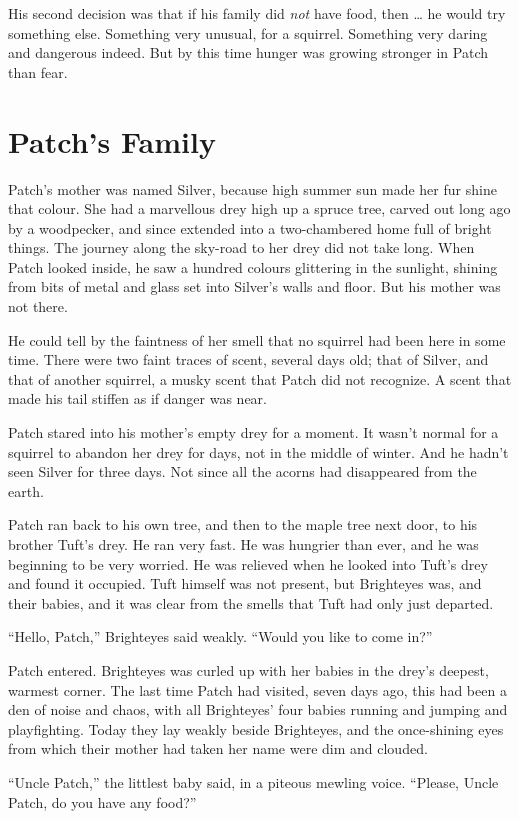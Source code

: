 \documentclass[ebook,oneside,openany,17pt]{memoir}
\renewcommand{\thechapter}{\Roman{chapter}}
\newcounter{sections}
\newcommand{\sections}[1]{%
  \section*{#1}
  \addtocounter{sections}{1}%
  \pdfbookmark[1]{#1}{section.\thechapter.\thesections}}
\begin{document}
His second decision was that if his family did \emph{not} have food,
then … he would try something else. Something very unusual, for a
squirrel. Something very daring and dangerous indeed. But by this time
hunger was growing stronger in Patch than fear.


\sections{Patch’s Family}

Patch’s mother was named Silver, because high summer sun made her fur
shine that colour. She had a marvellous drey high up a spruce tree,
carved out long ago by a woodpecker, and since extended into a
two-chambered home full of bright things. The journey along the
sky-road to her drey did not take long. When Patch looked inside, he
saw a hundred colours glittering in the sunlight, shining from bits of
metal and glass set into Silver’s walls and floor. But his mother was
not there.

He could tell by the faintness of her smell that no squirrel had been
here in some time. There were two faint traces of scent, several days
old; that of Silver, and that of another squirrel, a musky scent that
Patch did not recognize. A scent that made his tail stiffen as if
danger was near.

Patch stared into his mother’s empty drey for a moment. It wasn’t
normal for a squirrel to abandon her drey for days, not in the middle
of winter. And he hadn’t seen Silver for three days. Not since all the
acorns had disappeared from the earth.

Patch ran back to his own tree, and then to the maple tree next door,
to his brother Tuft’s drey. He ran very fast. He was hungrier than
ever, and he was beginning to be very worried. He was relieved when he
looked into Tuft’s drey and found it occupied. Tuft himself was not
present, but Brighteyes was, and their babies, and it was clear from
the smells that Tuft had only just departed.

“Hello, Patch,” Brighteyes said weakly. “Would you like to come in?”

Patch entered. Brighteyes was curled up with her babies in the drey’s
deepest, warmest corner. The last time Patch had visited, seven days
ago, this had been a den of noise and chaos, with all Brighteyes’ four
babies running and jumping and playfighting. Today they lay weakly
beside Brighteyes, and the once-shining eyes from which their mother
had taken her name were dim and clouded.

“Uncle Patch,” the littlest baby said, in a piteous mewling
voice. “Please, Uncle Patch, do you have any food?”
\end{document}
